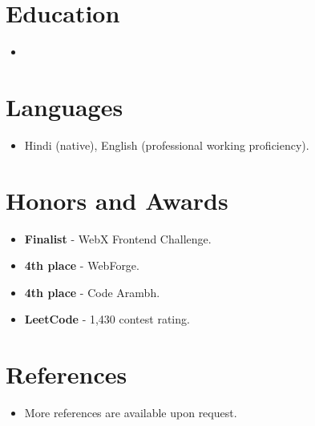 \documentclass[11pt,a4paper,sans]{moderncv}
\begin{document}

\section{Education}
\vspace{1pt}
\begin{itemize}

\item{}

\end{itemize}


\section{Languages}
\vspace{1pt}
\begin{itemize}
\item {Hindi (native), English (professional working proficiency).}
\end{itemize}


\section{Honors and Awards}
\vspace{1pt}
\begin{itemize}
\item{\textbf{Finalist} - WebX Frontend Challenge.}
\item{\textbf{4th place} - WebForge.}
\item{\textbf{4th place} - Code Arambh.}
\item{\textbf{LeetCode} - 1,430 contest rating.}
\end{itemize}


\section{References}
\vspace{1pt}
\begin{itemize}
\item{More references are available upon request.}
\end{itemize}
\end{document}
